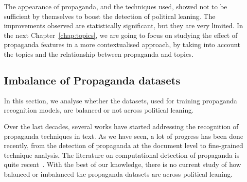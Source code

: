 The appearance of propaganda, and the techniques used, showed not to be sufficient by themselves to boost the detection of political leaning.
The improvements observed are statistically significant, but they are very limited.
In the next Chapter~\ref{chap:topics}, we are going to focus on studying the effect of propaganda features in a more contextualised approach, by taking into account the topics and the relationship between propaganda and topics.








\subsection{\statusgreen Imbalance of Propaganda datasets}
\label{ssec:ps_prop_leaning_imbalanced}


In this section, we analyse whether the datasets, used for training propaganda recognition models, are balanced or not across political leaning.




Over the last decades, several works have started addressing the recognition of propaganda techniques in text. As we have seen, a lot of progress has been done recently, from the detection of propaganda at the document level to fine-grained technique analysis. The literature on computational detection of propaganda is quite recent~\citep{da2020survey}.
With the best of our knowledge, there is no current study of how balanced or imbalanced the propaganda datasets are across political leaning.




